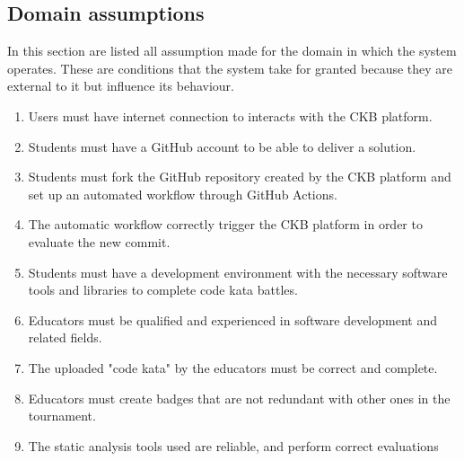 \subsection{Domain assumptions}
In this section are listed all assumption made for the domain in which the system operates. These are conditions that the system take for granted because they are external to it but influence its behaviour.
\begin{enumerate}[label=\textbf{DA.\arabic*}]
        \item {} {Users must have internet connection to interacts with the CKB platform.}
        \item {} {Students must have a GitHub account to be able to deliver a solution.}
        \item {} {Students must fork the GitHub repository created by the CKB platform and set up an automated workflow through GitHub Actions.}
        \item {} {The automatic workflow correctly trigger the CKB platform in order to evaluate the new commit.}
        \item {} {Students must have a development environment with the necessary software tools and libraries to complete code kata battles.}
        \item {} {Educators must be qualified and experienced in software development and related fields.}
        \item {} {The uploaded "code kata" by the educators must be correct and complete.}
        \item {} {Educators must create badges that are not redundant with other ones in the tournament.}
        \item {} {The static analysis tools used are reliable, and perform correct evaluations}
\end{enumerate}